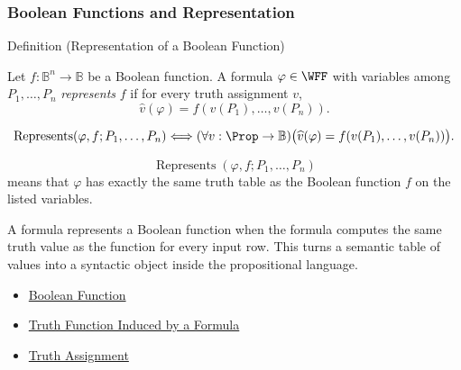 \subsubsection*{Boolean Functions and Representation}

\begin{definitionbox}{Definition (Representation of a Boolean Function)}
\begin{definition}
\label{def:boolean-function-representation-propositional-logic}
Let \(f:\mathbb{B}^n\to\mathbb{B}\) be a Boolean function. A formula
\(\varphi\in\WFF\) with variables among \(P_1,\ldots,P_n\) \emph{represents}
\(f\) if for every truth assignment \(v\),
\[
\widehat v(\varphi)=f(v(P_1),\ldots,v(P_n)).
\]
\end{definition}
\end{definitionbox}

\begin{remark*}
\[
\operatorname{Represents}(\varphi,f;P_1,\ldots,P_n)
\Longleftrightarrow
(\forall v:\Prop\to\mathbb{B})
\bigl(\widehat v(\varphi)=f(v(P_1),\ldots,v(P_n))\bigr).
\]
\end{remark*}

\begin{remark*}
\[
  \operatorname{Represents}(\varphi,f;P_1,\ldots,P_n)
\] means that
\(\varphi\) has exactly the same truth table as the Boolean function \(f\) on
the listed variables.
\end{remark*}

\begin{remark*}[Interpretation]
A formula represents a Boolean function when the formula computes the same
truth value as the function for every input row. This turns a semantic table of
values into a syntactic object inside the propositional language.
\end{remark*}

\begin{dependencies}
\begin{itemize}
  \item \hyperref[def:boolean-function-propositional-logic]{Boolean Function}
  \item \hyperref[def:truth-function-induced-by-formula]{Truth Function Induced by a Formula}
  \item \hyperref[def:truth-assignment-propositional-logic]{Truth Assignment}
\end{itemize}
\end{dependencies}

